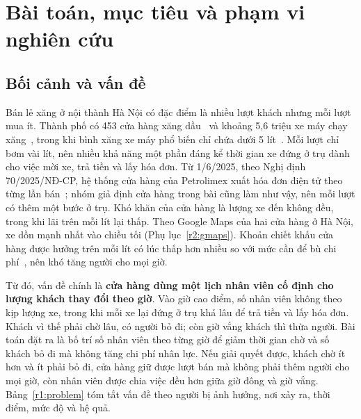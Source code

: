 
\section{Bài toán, mục tiêu và phạm vi nghiên cứu}
\label{r1:scope}
\subsection{Bối cảnh và vấn đề}
\noindent
Bán lẻ xăng ở nội thành Hà Nội có đặc điểm là nhiều lượt khách nhưng mỗi lượt mua ít. Thành phố có 453 cửa hàng xăng dầu~\cite{sct2026} và khoảng 5,6 triệu xe máy chạy xăng~\cite{vnex2025}, trong khi bình xăng xe máy phổ biến chỉ chứa dưới 5 lít~\cite{tank}. Mỗi lượt chỉ bơm vài lít, nên nhiều khả năng một phần đáng kể thời gian xe đứng ở trụ dành cho việc mời xe, trả tiền và lấy hóa đơn. Từ 1/6/2025, theo Nghị định 70/2025/NĐ-CP, hệ thống cửa hàng của Petrolimex xuất hóa đơn điện tử theo từng lần bán~\cite{nd70}; nhóm giả định cửa hàng trong bài cũng làm như vậy, nên mỗi lượt có thêm một bước ở trụ.
% 
Khó khăn của cửa hàng là lượng xe đến không đều, trong khi lãi trên mỗi lít lại thấp. Theo Google Maps của hai cửa hàng ở Hà Nội, xe dồn mạnh nhất vào chiều tối (Phụ lục~\ref{r2:gmaps}). Khoản chiết khấu cửa hàng được hưởng trên mỗi lít có lúc thấp hơn nhiều so với mức cần để bù chi phí~\cite{chietkhau}, nên khó tăng người cho mọi giờ.

Từ đó, vấn đề chính là \textbf{cửa hàng dùng một lịch nhân viên cố định cho lượng khách thay đổi theo giờ}. Vào giờ cao điểm, số nhân viên không theo kịp lượng xe, trong khi mỗi xe lại đứng ở trụ khá lâu để trả tiền và lấy hóa đơn. Khách vì thế phải chờ lâu, có người bỏ đi; còn giờ vắng khách thì thừa người. Bài toán đặt ra là bố trí số nhân viên theo từng giờ để giảm thời gian chờ và số khách bỏ đi mà không tăng chi phí nhân lực.
%
Nếu giải quyết được, khách chờ ít hơn và ít phải bỏ đi, cửa hàng giữ được lượt bán mà không phải thêm người cho mọi giờ, còn nhân viên được chia việc đều hơn giữa giờ đông và giờ vắng.
% 
Bảng~\ref{r1:problem} tóm tắt vấn đề theo người bị ảnh hưởng, nơi xảy ra, thời điểm, mức độ và hệ quả.

